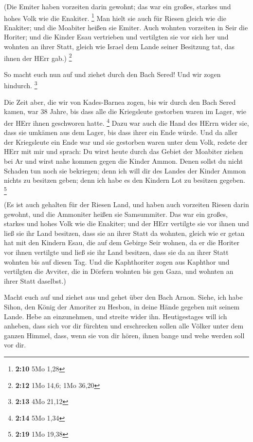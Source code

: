  (Die Emiter haben vorzeiten darin gewohnt; das war ein
großes, starkes und hohes Volk wie die Enakiter. \footnote{\textbf{2:10}
  5Mo 1,28}  Man hielt sie auch für Riesen gleich wie die
Enakiter; und die Moabiter heißen sie Emiter.  Auch
wohnten vorzeiten in Seir die Horiter; und die Kinder Esau vertrieben
und vertilgten sie vor sich her und wohnten an ihrer Statt, gleich wie
Israel dem Lande seiner Besitzung tat, das ihnen der HErr gab.)
\footnote{\textbf{2:12} 1Mo 14,6; 1Mo 36,20}

 So macht euch nun auf und ziehet durch den Bach Sered!
Und wir zogen hindurch. \footnote{\textbf{2:13} 4Mo 21,12}

 Die Zeit aber, die wir von Kades-Barnea zogen, bis wir
durch den Bach Sered kamen, war 38 Jahre, bis dass alle die Kriegsleute
gestorben waren im Lager, wie der HErr ihnen geschworen hatte.
\footnote{\textbf{2:14} 5Mo 1,34}  Dazu war auch die Hand
des HErrn wider sie, dass sie umkämen aus dem Lager, bis dass ihrer ein
Ende würde.  Und da aller der Kriegsleute ein Ende war
und sie gestorben waren unter dem Volk,  redete der HErr
mit mir und sprach:  Du wirst heute durch das Gebiet der
Moabiter ziehen bei Ar  und wirst nahe kommen gegen die
Kinder Ammon. Denen sollst du nicht Schaden tun noch sie bekriegen; denn
ich will dir des Landes der Kinder Ammon nichts zu besitzen geben; denn
ich habe es den Kindern Lot zu besitzen gegeben. \footnote{\textbf{2:19}
  1Mo 19,38}

 (Es ist auch gehalten für der Riesen Land, und haben
auch vorzeiten Riesen darin gewohnt, und die Ammoniter heißen sie
Samsummiter.  Das war ein großes, starkes und hohes Volk
wie die Enakiter; und der HErr vertilgte sie vor ihnen und ließ sie ihr
Land besitzen, dass sie an ihrer Statt da wohnten, 
gleich wie er getan hat mit den Kindern Esau, die auf dem Gebirge Seir
wohnen, da er die Horiter vor ihnen vertilgte und ließ sie ihr Land
besitzen, dass sie da an ihrer Statt wohnten bis auf diesen Tag.
 Und die Kaphthoriter zogen aus Kaphthor und vertilgten
die Avviter, die in Dörfern wohnten bis gen Gaza, und wohnten an ihrer
Statt daselbst.)

 Macht euch auf und ziehet aus und gehet über den Bach
Arnon. Siehe, ich habe Sihon, den König der Amoriter zu Hesbon, in deine
Hände gegeben mit seinem Lande. Hebe an einzunehmen, und streite wider
ihn.  Heutigestages will ich anheben, dass sich vor dir
fürchten und erschrecken sollen alle Völker unter dem ganzen Himmel,
dass, wenn sie von dir hören, ihnen bange und wehe werden soll vor dir.


